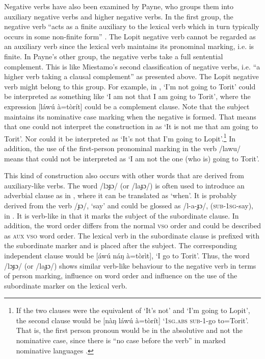 \documentclass[output=paper,colorlinks,citecolor=brown,draftmode]{langscibook}
\begin{document}
Negative verbs have also been examined by Payne, who groups them into auxiliary negative verbs and higher negative verbs. In the first group, the negative verb “acts as a finite auxiliary to the lexical verb which in turn typically occurs in some non-finite form” \citep[207]{Payne1985}. The Lopit negative verb cannot be regarded as an auxiliary verb since the lexical verb maintains its pronominal marking, i.e. is finite. In Payne’s other group, the negative verbs take a full sentential complement. This is like Miestamo’s second classification of negative verbs, i.e.  “a higher verb taking a clausal complement” as presented above. The Lopit negative verb might belong to this group. For example, in , ‘I’m not going to Torit’ could be interpreted as something like ‘I am not that I am going to Torit’, where the expression [láwú à=tòrít] could be a complement clause. Note that the subject maintains its nominative case marking when the negative is formed. That means that one could not interpret the construction in  as ‘It is not me that am going to Torit’. Nor could it be interpreted as ‘It’s not that I’m going to Lopit’.\footnote{If the two clauses were the equivalent of ‘It’s not’ and ‘I’m going to Lopit’, the second clause would be [nàŋ láwú à=tòrít] ‘1\textsc{sg.abs} \textsc{sub-1-}go to=Torit’. That is, the first person pronoun would be in the absolutive and not the nominative case, since there is “no case before the verb” in marked nominative languages \citep{König2006}.} In addition, the use of the first-person pronominal marking in the verb /lawu/ means that  could not be interpreted as ‘I am not the one (who is) going to Torit’. 


This kind of construction also occurs with other words that are derived from auxiliary-like verbs. The word /lɔɟɔ/ (or /laɟɔ/) is often used to introduce an adverbial clause as in , where it can be translated as ‘when’. It is probably derived from the verb /ɟɔ/, ‘say’ and could be glossed as /l-a-ɟɔ/, (\textsc{sub-1sg}{}-say), in . It is verb-like in that it marks the subject of the subordinate clause. In addition, the word order differs from the normal \textsc{vso} order and could be described as \textsc{aux} \textsc{vso} word order. The lexical verb in the subordinate clause is prefixed with the subordinate marker and is placed after the subject. The corresponding independent clause would be [áwú náŋ à=tòrìt], ‘I go to Torit’. Thus, the word /lɔɟɔ/ (or /laɟɔ/) shows similar verb-like behaviour to the negative verb in terms of person marking, influence on word order and influence on the use of the subordinate marker on the lexical verb.
\end{document}
